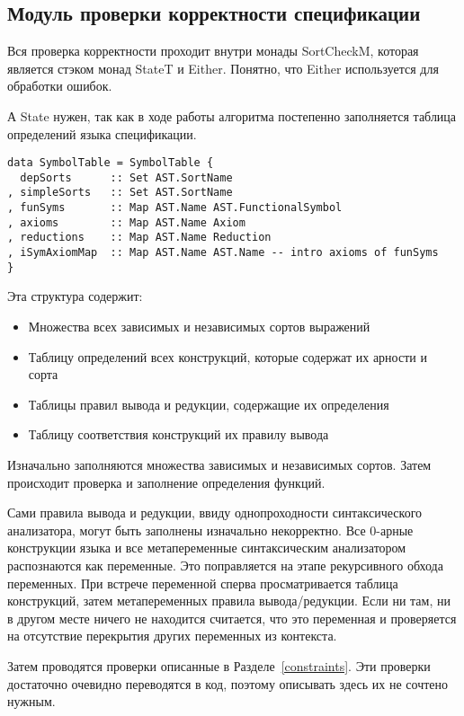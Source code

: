 \subsection{Модуль проверки корректности спецификации}\label{sortcheck}
Вся проверка корректности проходит внутри монады SortCheckM, которая является стэком монад StateT и Either. Понятно, что Either используется для обработки ошибок.

А State нужен, так как в ходе работы алгоритма постепенно заполняется таблица определений языка спецификации.

\begin{lstlisting}[caption={Структура заполняемая модулем проверки спецификации},captionpos=b,frame=single, label={SymTab}]
data SymbolTable = SymbolTable {
  depSorts      :: Set AST.SortName
, simpleSorts   :: Set AST.SortName
, funSyms       :: Map AST.Name AST.FunctionalSymbol
, axioms        :: Map AST.Name Axiom
, reductions    :: Map AST.Name Reduction
, iSymAxiomMap  :: Map AST.Name AST.Name -- intro axioms of funSyms
}
\end{lstlisting}

Эта структура содержит:
\begin{itemize}
\item Множества всех зависимых и независимых сортов выражений
\item Таблицу определений всех конструкций, которые содержат их арности и сорта
\item Таблицы правил вывода и редукции, содержащие их определения
\item Таблицу соответствия конструкций их правилу вывода
\end{itemize}

Изначально заполняются множества зависимых и независимых сортов. Затем происходит проверка и заполнение определения функций.

Сами правила вывода и редукции, ввиду однопроходности синтаксического анализатора, могут быть заполнены изначально некорректно. Все 0-арные конструкции языка и все метапеременные синтаксическим анализатором распознаются как переменные. Это поправляется на этапе рекурсивного обхода переменных. При встрече переменной сперва просматривается таблица конструкций, затем метапеременных правила вывода/редукции. Если ни там, ни в другом месте ничего не находится считается, что это переменная и проверяется на отсутствие перекрытия других переменных из контекста.

Затем проводятся проверки описанные в Разделе~\ref{constraints}. Эти проверки достаточно очевидно переводятся в код, поэтому описывать здесь их не сочтено нужным.




















